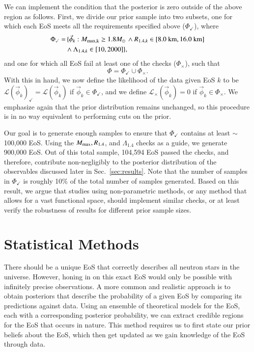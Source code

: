 \documentclass[aps,prd,nofootinbib,tightenlines,notitlepage,floatfix,superscriptaddress,showkeys,twocolumn]{revtex4-1}
\begin{document}
We can implement the condition that the posterior is zero outside of the above region as follows. First, we divide our prior sample into two subsets, one for which each EoS meets all the requirements specified above ($\Phi_\checkmark$), where
\begin{eqnarray}
    \Phi_\checkmark = & \, \{\vec{\phi}_k : M_{\rm max, k} \geq 1.8 M_\odot \, \wedge R_{1.4,k} \in [8.0\textrm{ km},16.0\textrm{ km}] \nonumber \\
    & \wedge \Lambda_{1.4,k} \in [10,2000]\},
\end{eqnarray}
and one for which all EoS fail at least one of the checks ($\Phi_\times$), such that
\begin{equation}
    \Phi = \Phi_\checkmark \cup \Phi_\times.
\end{equation} 
With this in hand, we now define the likelihood of the data given EoS $k$ to be $\mathcal{L}(\vec{\phi}_k)_\checkmark = \mathcal{L}(\vec{\phi}_k)$ if $\vec{\phi}_k\in \Phi_\checkmark$, and we define $\mathcal{L}_\times(\vec{\phi}_k) = 0$ if $\vec{\phi}_k\in \Phi_\times$. We emphasize again that the prior distribution remains unchanged, so this procedure is in no way equivalent to performing cuts on the prior. 

Our goal is to generate enough samples to ensure that $\Phi_\checkmark$ contains at least $\sim$100,000 EoS. Using the $M_{\rm max}, R_{1.4}$, and $\Lambda_{1.4}$ checks as a guide, we generate 900,000 EoS. Out of this total sample, 104,594 EoS passed the checks, and therefore, contribute non-negligibly to the posterior distribution of the observables discussed later in Sec.~\ref{sec:results}. Note that the number of samples in $\Phi_\checkmark$ is roughly 10\% of the total number of samples generated. Based on this result, we argue that studies using non-parametric methods, or any method that allows for a vast functional space, should implement similar checks, or at least verify the robustness of results for different prior sample sizes. 

\section{Statistical Methods}\label{sec:statmethods}

There should be a unique EoS that correctly describes all neutron stars in the universe. However, honing in on this exact EoS would only be possible with infinitely precise observations. A more common and realistic approach is to obtain posteriors that describe the probability of a given EoS by comparing its predictions against data. Using an ensemble of theoretical models for the EoS, each with a corresponding posterior probability, we can extract credible regions for the EoS that occurs in nature. This method requires us to first state our prior beliefs about the EoS, which then get updated as we gain knowledge of the EoS through data. 
\end{document}
